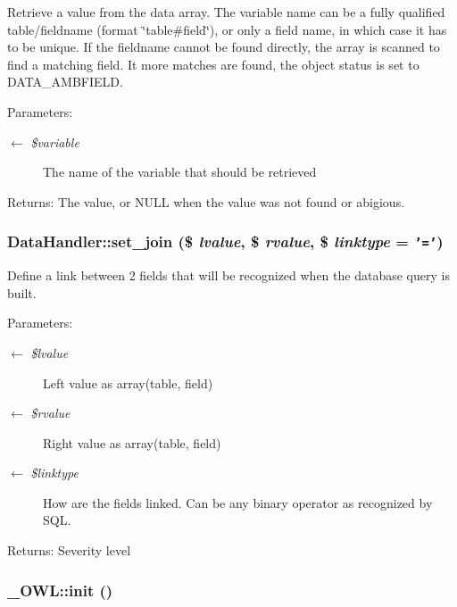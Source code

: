 Retrieve a value from the data array. The variable name can be a fully qualified table/fieldname (format \char`\"{}table\#field\char`\"{}), or only a field name, in which case it has to be unique. If the fieldname cannot be found directly, the array is scanned to find a matching field. It more matches are found, the object status is set to DATA\_\-AMBFIELD.

\begin{Desc}
\item[Parameters:]
\begin{description}
\item[\mbox{$\leftarrow$} {\em \$variable}]The name of the variable that should be retrieved \end{description}
\end{Desc}
\begin{Desc}
\item[Returns:]The value, or NULL when the value was not found or abigious. \end{Desc}
\hypertarget{classDataHandler_9b77733f02e9d6281fc40df110c0ba70}{
\subsubsection{\setlength{\rightskip}{0pt plus 5cm}DataHandler::set\_\-join (\$ {\em lvalue}, \$ {\em rvalue}, \$ {\em linktype} = {\tt '='})}}
\label{classDataHandler_9b77733f02e9d6281fc40df110c0ba70}


Define a link between 2 fields that will be recognized when the database query is built.

\begin{Desc}
\item[Parameters:]
\begin{description}
\item[\mbox{$\leftarrow$} {\em \$lvalue}]Left value as array(table, field) \item[\mbox{$\leftarrow$} {\em \$rvalue}]Right value as array(table, field) \item[\mbox{$\leftarrow$} {\em \$linktype}]How are the fields linked. Can be any binary operator as recognized by SQL. \end{description}
\end{Desc}
\begin{Desc}
\item[Returns:]Severity level \end{Desc}
\hypertarget{class__OWL_e0ef3ded56e8a6b34b6461e5a721cd3e}{
\subsubsection{\setlength{\rightskip}{0pt plus 5cm}\_\-OWL::init ()}}
\label{class__OWL_e0ef3ded56e8a6b34b6461e5a721cd3e}


